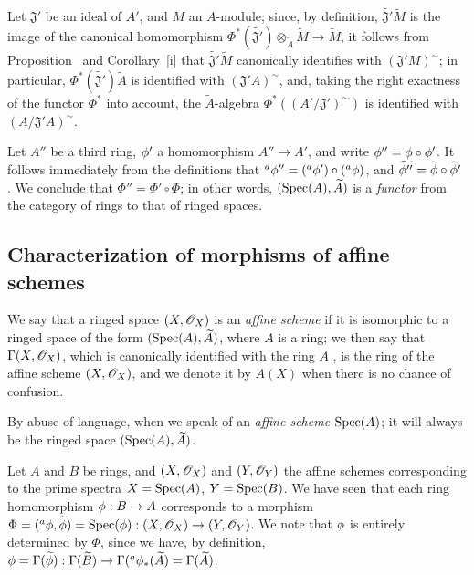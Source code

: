 \begin{env}[1.6.9]
\label{1.1.6.9}
Let $\mathfrak{J}'$ be an ideal of $A'$, and $M$ an $A$-module;
since, by definition, $\widetilde{\mathfrak{J}'}\widetilde{M}$ is the image of the canonical homomorphism $\Phi^*(\widetilde{\mathfrak{J}'})\otimes_{\widetilde{A}}\widetilde{M}\to\widetilde{M}$, it
follows from Proposition~ and Corollary~[i] that
$\widetilde{\mathfrak{J}'}\widetilde{M}$ canonically identifies with $(\mathfrak{J}' M)^\sim$;
in particular, $\Phi^*(\widetilde{\mathfrak{J}'})\widetilde{A}$ is identified with $(\mathfrak{J}' A)^\sim$, and, taking the right exactness of the functor $\Phi^*$ into account,
the $\widetilde{A}$-algebra $\Phi^*((A'/\mathfrak{J}')^\sim)$ is identified with $(A/\mathfrak{J}' A)^\sim$.
\end{env}

\begin{env}[1.6.10]
\label{1.1.6.10}
Let $A''$ be a third ring, $\phi'$ a homomorphism $A''\to A'$, and write $\phi''=\phi\circ\phi'$.
It follows immediately from the definitions that ${}^a\phi''=({}^a\phi')\circ({}^a\phi)$, and $\widetilde{\phi''}=\widetilde{\phi}\circ\widetilde{\phi'}$ . We conclude that $\Phi''=\Phi'\circ\Phi$;
in other words, $(\operatorname{Spec}(A),\widetilde{A})$ is a \emph{functor} from the category of rings to that of ringed spaces.
\end{env}

\subsection{Characterization of morphisms of affine schemes}
\label{subsection:1.1.7}

\begin{definition}[1.7.1]
\label{1.1.7.1}
We say that a ringed space $(X,\mathscr{O}_X)$ is an \emph{affine scheme} if it is isomorphic to a ringed space of the form $(\operatorname{Spec}(A),\widetilde{A})$, where $A$ is a ring;
we then say that $\Gamma(X,\mathscr{O}_X)$, which is canonically identified with the ring $A$ , is the ring of the affine scheme $(X,\mathscr{O}_X)$, and we denote it by $A(X)$ when there is no chance of confusion.
\end{definition}

By abuse of language, when we speak of an \emph{affine scheme $\operatorname{Spec}(A)$}; it will always be the ringed space $(\operatorname{Spec}(A),\widetilde{A})$.
\begin{env}[1.7.2]
\label{1.1.7.2}
Let $A$ and $B$ be rings, and $(X,\mathscr{O}_X)$ and $(Y,\mathscr{O}_Y)$ the affine schemes corresponding to the prime spectra $X=\operatorname{Spec}(A)$, $Y=\operatorname{Spec}(B)$.
We have seen  that each ring homomorphism $\vphi:B\to A$ corresponds to a morphism $\Phi=({}^a\vphi,\widetilde{\vphi})=\Spec(\vphi):(X,\sh{O}_X)\to(Y,\sh{O}_Y)$.
We note that $\phi$ is entirely determined by $\Phi$, since we have, by definition, $\vphi=\Gamma(\widetilde{\vphi}):\Gamma(\widetilde{B})\to\Gamma({}^a\vphi_*(\widetilde{A})=\Gamma(\widetilde{A})$.
\end{env}

